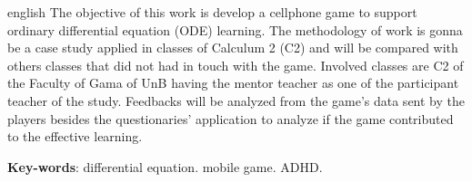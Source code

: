 \begin{resumo}[Abstract]
 \begin{otherlanguage*}{english}     
   The objective of this work is develop a cellphone game to support ordinary differential equation (ODE) learning. The methodology of work is gonna be a case study applied in classes of Calculum 2 (C2) and will be compared with others classes that did not had in touch with the game. Involved classes are C2 of the Faculty of Gama of UnB having the mentor teacher as one of the participant teacher of the study. Feedbacks will be analyzed from the game's data sent by the players besides the questionaries' application to analyze if the game contributed to the effective learning.
   
   \begin{comment}
   metodologia 
   revisão bibliográfica 
   estudo de caso 
      software educacional 
   ensino equações diferenciais ordinárias
   auxílio de aprendizagem de EDO
   Faculdade do Gama
   diagnostico através da avaliação
   aplicação de questionário
   \end{comment}
   

   \vspace{\onelineskip}
 
   \noindent 
   \textbf{Key-words}: differential equation. mobile game. ADHD.
 \end{otherlanguage*}
\end{resumo}

